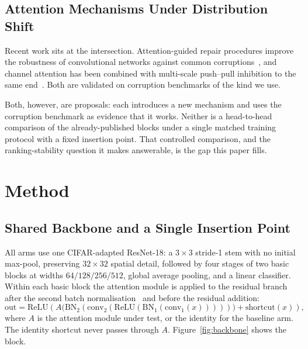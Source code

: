 \documentclass[10pt]{article}
\begin{document}
\subsection{Attention Mechanisms Under Distribution Shift}

Recent work sits at the intersection. Attention-guided repair procedures improve
the robustness of convolutional networks against common
corruptions~\citep{ar2repair2025}, and channel attention has been combined with
multi-scale push--pull inhibition to the same end~\citep{pushpull2025}. Both are
validated on corruption benchmarks of the kind we use.

Both, however, are proposals: each introduces a new mechanism and uses the
corruption benchmark as evidence that it works. Neither is a head-to-head
comparison of the already-published blocks under a single matched training
protocol with a fixed insertion point. That controlled comparison, and the
ranking-stability question it makes answerable, is the gap this paper fills.

\section{Method}
\label{sec:method}

\subsection{Shared Backbone and a Single Insertion Point}
\label{sec:backbone}

All arms use one CIFAR-adapted ResNet-18: a $3\times3$ stride-1 stem with no
initial max-pool, preserving $32\times32$ spatial detail, followed by four
stages of two basic blocks at widths $64/128/256/512$, global average pooling,
and a linear classifier. Within each basic block the attention module is applied
to the residual branch after the second batch
normalisation~\citep{ioffe2015batch} and before the residual addition:
%
\begin{equation}
  \mathrm{out} = \mathrm{ReLU}\!\left(
    A\big(\mathrm{BN}_2(\mathrm{conv}_2(\mathrm{ReLU}(\mathrm{BN}_1(\mathrm{conv}_1(x)))))\big)
    + \mathrm{shortcut}(x)\right),
  \label{eq:block}
\end{equation}
%
where $A$ is the attention module under test, or the identity for the baseline
arm. The identity shortcut never passes through $A$. Figure~\ref{fig:backbone}
shows the block.
\end{document}
